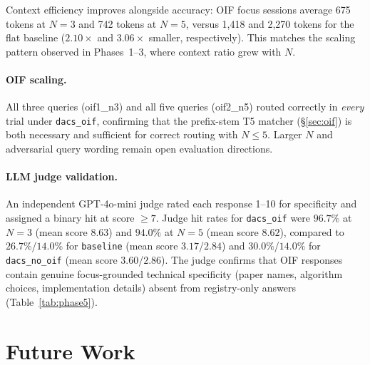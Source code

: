\documentclass{article}
\begin{document}
Context efficiency improves alongside accuracy:
OIF focus sessions average 675 tokens at $N=3$ and 742 tokens at
$N=5$, versus 1{,}418 and 2{,}270 tokens for the flat baseline
($2.10\times$ and $3.06\times$ smaller, respectively).
This matches the scaling pattern observed in Phases~1--3, where
context ratio grew with $N$.

\paragraph{OIF scaling.}
All three queries (oif1\_n3) and all five queries (oif2\_n5)
routed correctly in \emph{every} trial under \texttt{dacs\_oif},
confirming that the prefix-stem T5 matcher (\S\ref{sec:oif})
is both necessary and sufficient for correct routing with $N{\le}5$.
Larger $N$ and adversarial query wording remain open evaluation directions.

\paragraph{LLM judge validation.}
An independent GPT-4o-mini judge rated each response 1--10 for specificity
and assigned a binary hit at score $\ge 7$.
Judge hit rates for \texttt{dacs\_oif} were $96.7\%$ at $N{=}3$
(mean score $8.63$) and $94.0\%$ at $N{=}5$ (mean score $8.62$),
compared to $26.7\%$/$14.0\%$ for \texttt{baseline}
(mean score $3.17$/$2.84$) and $30.0\%$/$14.0\%$ for
\texttt{dacs\_no\_oif} (mean score $3.60$/$2.86$).
The judge confirms that OIF responses contain genuine
focus-grounded technical specificity (paper names, algorithm choices,
implementation details) absent from registry-only answers
(Table~\ref{tab:phase5}).

\section{Future Work}
\label{sec:future_work}
\end{document}

